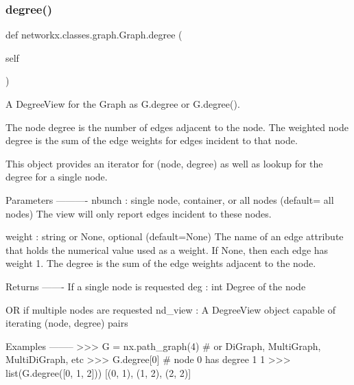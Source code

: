  \mbox{\label{classnetworkx_1_1classes_1_1graph_1_1Graph_ad6c8ec6a4c6f1d1665f107ab4ab7199d}} 
\subsubsection{\texorpdfstring{degree()}{degree()}}
{\footnotesize\ttfamily def networkx.\+classes.\+graph.\+Graph.\+degree (\begin{DoxyParamCaption}\item[{}]{self }\end{DoxyParamCaption})}

\begin{DoxyVerb}A DegreeView for the Graph as G.degree or G.degree().

The node degree is the number of edges adjacent to the node.
The weighted node degree is the sum of the edge weights for
edges incident to that node.

This object provides an iterator for (node, degree) as well as
lookup for the degree for a single node.

Parameters
----------
nbunch : single node, container, or all nodes (default= all nodes)
    The view will only report edges incident to these nodes.

weight : string or None, optional (default=None)
   The name of an edge attribute that holds the numerical value used
   as a weight.  If None, then each edge has weight 1.
   The degree is the sum of the edge weights adjacent to the node.

Returns
-------
If a single node is requested
deg : int
    Degree of the node

OR if multiple nodes are requested
nd_view : A DegreeView object capable of iterating (node, degree) pairs

Examples
--------
>>> G = nx.path_graph(4)  # or DiGraph, MultiGraph, MultiDiGraph, etc
>>> G.degree[0]  # node 0 has degree 1
1
>>> list(G.degree([0, 1, 2]))
[(0, 1), (1, 2), (2, 2)]
\end{DoxyVerb}
 \mbox{\label{classnetworkx_1_1classes_1_1graph_1_1Graph_a7e500aeb6bfa21f9120e0eecd36ebd83}} 
